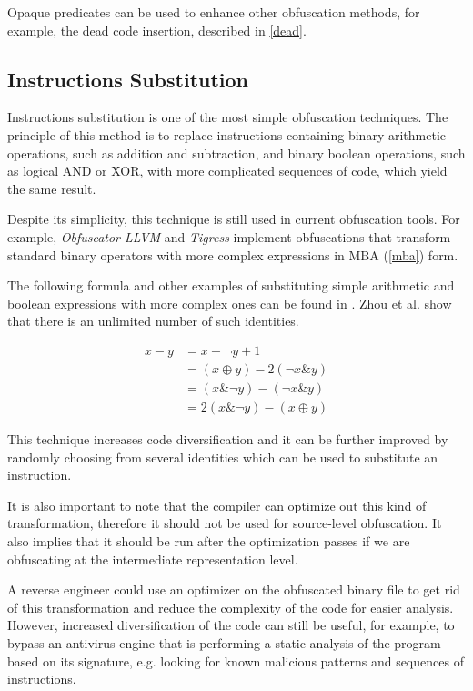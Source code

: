 \documentclass[
  digital, %
  table,   %
  twoside, %
  nolof,     %
  nolot,     %
]{fithesis3}
\theoremstyle{definition}
\begin{document}
Opaque predicates can be used to enhance other obfuscation methods, for example, the dead code insertion, described in \ref{dead}. 

\subsection{Instructions Substitution} \label{substitution}
Instructions substitution is one of the most simple obfuscation techniques. The principle of this method is to replace instructions containing binary arithmetic operations, such as addition and subtraction, and binary boolean operations, such as logical AND or XOR, with more complicated sequences of code, which yield the same result. 

Despite its simplicity, this technique is still used in current obfuscation tools. For example, \textit{Obfuscator-LLVM} and \textit{Tigress} implement obfuscations that transform standard binary operators with more complex expressions in MBA (\ref{mba}) form.

The following formula and other examples of substituting simple arithmetic and boolean expressions with more complex ones can be found in \cite{hackers_delight}. Zhou et al. \cite{mba_zhou} show that there is an unlimited number of such identities. 

\begin{equation}
\begin{split}
    x - y & = x + \neg y + 1 \\
    & = (x \oplus y) - 2(\neg x \& y)\\
    & = (x \& \neg y) - (\neg x \& y) \\
    & = 2(x \& \neg y) - (x\oplus y)
    \end{split}
\end{equation}

This technique increases code diversification and it can be further improved by randomly choosing from several identities which can be used to substitute an instruction. 

It is also important to note that the compiler can optimize out this kind of transformation, therefore it should not be used for source-level obfuscation. It also implies that it should be run after the optimization passes if we are obfuscating at the intermediate representation level. 

A reverse engineer could use an optimizer on the obfuscated binary file to get rid of this transformation and reduce the complexity of the code for easier analysis. However, increased diversification of the code can still be useful, for example, to bypass an antivirus engine that is performing a static analysis of the program based on its signature, e.g. looking for known malicious patterns and sequences of instructions.
\end{document}
